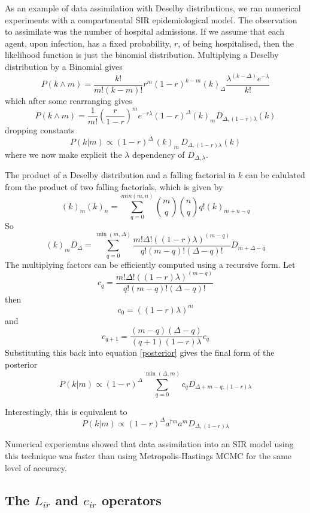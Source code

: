 \documentclass[letterpaper,twocolumn,10pt]{article}
\begin{document}
As an example of data assimilation with Deselby distributions, we ran numerical experiments with a compartmental SIR epidemiological model. The observation to assimilate was the number of hospital admissions. If we assume that each agent, upon infection, has a fixed probability, $r$, of being hospitalised, then the likelihood function is just the binomial distribution. Multiplying a Deselby distribution by a Binomial gives
\[
P(k \wedge m) = \frac{k!}{m!(k-m)!}r^m(1-r)^{k-m} (k)_\Delta \frac{\lambda^{(k-\Delta)}e^{-\lambda}}{k!}
\]
which after some rearranging gives
\[
P(k \wedge m) = \frac{1}{m!}\left(\frac{r}{1-r}\right)^m e^{-r\lambda} (1-r)^\Delta (k)_m D_{\Delta,(1-r)\lambda}(k)
\]
dropping constants
\begin{equation}
P(k|m) \propto (1-r)^\Delta \, (k)_m \,D_{\Delta,(1-r)\lambda}(k)
\label{posterior}
\end{equation}
where we now make explicit the $\lambda$ dependency of $D_{\Delta,\lambda}$.

The product of a Deselby distribution and a falling factorial in $k$ can be calulated from the product of two falling factorials, which is given by
\[
(k)_m(k)_n = \sum_{q=0}^{min(m,n)} {m \choose q}{n \choose q}q!(k)_{m+n-q}
\]
So
\[
(k)_m D_\Delta = \sum_{q=0}^{\min(m,\Delta)} \frac{m!\Delta!\left((1-r)\lambda\right)^{(m-q)}}{q!(m-q)!(\Delta-q)!} D_{m+\Delta-q}
\]
The multiplying factors can be efficiently computed using a recursive form. Let
\[
c_q = \frac{m!\Delta!\left((1-r)\lambda\right)^{(m-q)}}{q!(m-q)!(\Delta-q)!}
\]
then
\[
c_0 = ((1-r)\lambda)^m
\]
and
\[
c_{q+1} = \frac{(m-q)(\Delta - q)}{(q+1)(1-r)\lambda} c_q
\]
Substituting this back into equation \ref{posterior} gives the final form of the posterior
\begin{equation}
P(k|m) \propto (1-r)^\Delta \sum_{q=0}^{\min(\Delta,m)} c_q D_{\Delta+m-q,(1-r)\lambda}
\end{equation}

Interestingly, this is equivalent to
\begin{equation}
P(k|m) \propto (1-r)^\Delta a^{\dag m}a^m D_{\Delta,(1-r)\lambda}
\end{equation}


Numerical experiemtns showed that data assimilation into an SIR model using this technique was faster than using Metropolis-Hastings MCMC for the same level of accuracy.

\subsection{The $L_{ir}$ and $e_{ir}$ operators}
\end{document}
